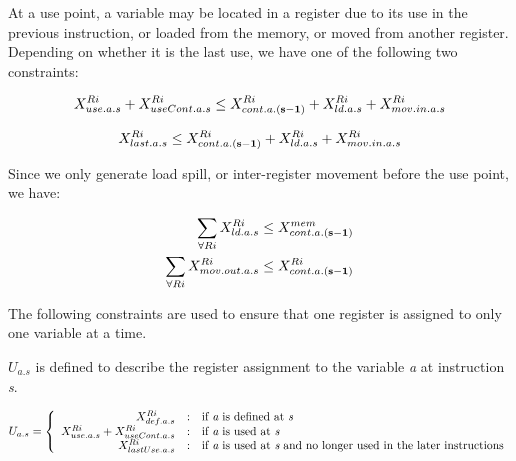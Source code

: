 At a use point, a variable may be located in a register due to its use in the
previous instruction, or loaded from the memory, or moved
from another register. Depending on whether it is the last use, we
have one of the following two constraints:

\begin{small}
\begin{eqnarray}
X_{use.a.s}^{Ri} + X_{useCont.a.s}^{Ri} \leq X_{cont.a.{\bf(s-1)}}^{Ri} + X_{ld.a.s}^{Ri} + X_{mov.in.a.s}^{Ri} 
\nonumber 
\end{eqnarray}
\end{small}
\vspace{-0.1in}
\begin{small}
\begin{eqnarray}X_{last.a.s}^{Ri} \leq X_{cont.a.{\bf(s-1)}}^{Ri} + X_{ld.a.s}^{Ri} + X_{mov.in.a.s}^{Ri} 
\end{eqnarray}
\end{small}

Since we only generate load spill, or inter-register movement
before the use point, we have:

\begin{small}
\begin{eqnarray}
\sum_{\forall Ri}X_{ld.a.s}^{Ri} \leq X_{cont.a.{\bf(s-1)}}^{mem} \nonumber \\
\sum_{\forall Ri}X_{mov.out.a.s}^{Ri} \leq X_{cont.a.{\bf(s-1)}}^{Ri}
\end{eqnarray}
\end{small}

The following constraints are used to ensure that one register is assigned to
only one variable at a time.

$U_{a.s}$ is defined to describe the register assignment to the variable {\it a}
at instruction {\it s}.

\begin{small}
\begin{eqnarray}
U_{a.s} = \left\{\begin{array}{r@{\quad:\quad}l} 
X_{def.a.s}^{Ri} & \mbox{if {\it a} is defined at {\it s}} \\ 
X_{use.a.s}^{Ri} + X_{useCont.a.s}^{Ri} & \mbox{if {\it a} is used at {\it s}} \\
X_{lastUse.a.s}^{Ri} & \mbox{if {\it a} is used at {\it s} and no longer used in the later 
instructions}\end{array}\right. 
\end{eqnarray}
\end{small}

